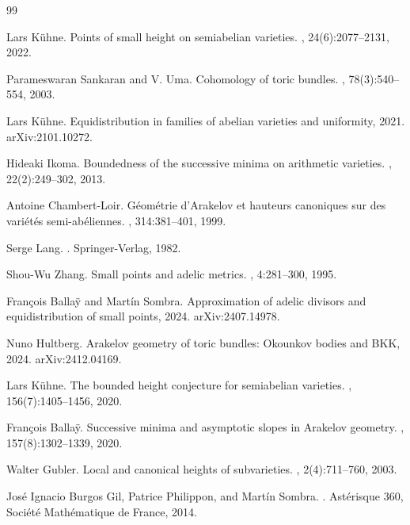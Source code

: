 \documentclass[10pt,a4paper]{amsart}
\theoremstyle{plain}
\theoremstyle{plain}
\numberwithin{equation}{section}
\begin{document}
	\begin{thebibliography}{99}
		
		Lars K{\"u}hne.
		\newblock Points of small height on semiabelian varieties.
		, 24(6):2077--2131, 2022.
		
		Parameswaran Sankaran and V. Uma.
		\newblock Cohomology of toric bundles.
		, 78(3):540--554, 2003.
		
		Lars K{\"u}hne.
		\newblock Equidistribution in families of abelian varieties and uniformity, 2021.
		\newblock arXiv:2101.10272.
		
		Hideaki Ikoma.
		\newblock Boundedness of the successive minima on arithmetic varieties.
		, 22(2):249--302, 2013.
		
		Antoine Chambert-Loir.
		\newblock G\'eom\'etrie d'Arakelov et hauteurs canoniques sur des vari\'et\'es semi-ab\'eliennes.
		, 314:381--401, 1999.
		
		Serge Lang.
		.
		\newblock Springer-Verlag, 1982.
		
		Shou-Wu Zhang.
		\newblock Small points and adelic metrics.
		, 4:281--300, 1995.
		
		Fran{\c c}ois Balla{\"y} and Mart\'in Sombra.
		\newblock Approximation of adelic divisors and equidistribution of small points, 2024.
		\newblock arXiv:2407.14978.
		
		Nuno Hultberg.
		\newblock Arakelov geometry of toric bundles: Okounkov bodies and BKK, 2024.
		\newblock arXiv:2412.04169.
		
		Lars K{\"u}hne.
		\newblock The bounded height conjecture for semiabelian varieties.
		, 156(7):1405--1456, 2020.
		
		Fran{\c c}ois Balla{\"y}.
		\newblock Successive minima and asymptotic slopes in Arakelov geometry.
		, 157(8):1302--1339, 2020.
		
		Walter Gubler.
		\newblock Local and canonical heights of subvarieties.
		, 2(4):711--760, 2003.
		
		Jos{\'e} Ignacio Burgos Gil, Patrice Philippon, and Mart\'in Sombra.
		.
		\newblock Ast\'erisque 360, Soci\'et\'e Math\'ematique de France, 2014.
		

\end{thebibliography}
\end{document}
